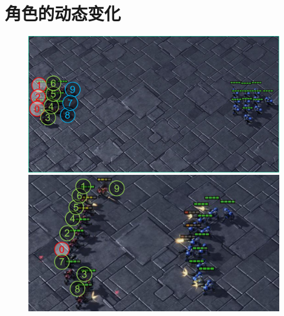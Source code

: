 \section{角色的动态变化}\label{sec:dynamic-role}

\begin{figure}
    \centering
    \includegraphics[height=0.24\linewidth]{figures/dynamic/10m_vs_11m-g1.pdf}\hfill
    \includegraphics[height=0.24\linewidth]{figures/dynamic/10m_vs_11m-g2.pdf}\\
    \hfill
    \\


\end{figure}

